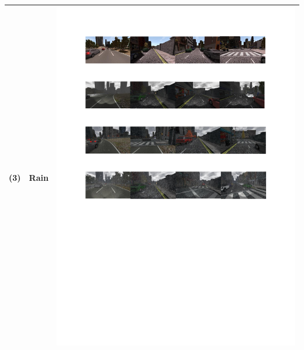 \begin{table}[!t]
\begin{tabular}{|C{1cm}|c|C{13.5cm}|}
		(3)	& Rain &  \begin{minipage}{.9\textwidth}\includegraphics[scale=.8,trim=2cm 16.5cm 2cm 10.5cm,clip]{examples.pdf}\end{minipage} \\ \hline

\end{tabular}
\end{table}
